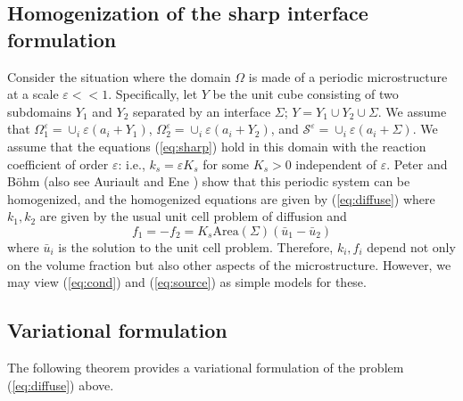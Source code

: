 \documentclass[11pt]{article}
\begin{document}
\subsection{Homogenization of the sharp interface formulation}

Consider the situation where the domain $\Omega$ is made of a periodic microstructure at a scale $\varepsilon << 1$.  Specifically, let $Y$ be the unit cube consisting of two subdomains $Y_1$ and $Y_2$ separated by an interface $\Sigma$; $Y = Y_1 \cup Y_2\cup\Sigma$.  We assume that $\Omega^\varepsilon_1 = \cup_i \varepsilon (a_i + Y_1)$, $\Omega^\varepsilon_2 = \cup_i \varepsilon (a_i + Y_2)$, and ${\mathcal S}^\varepsilon = \cup_i \varepsilon (a_i + \Sigma)$.  We assume that the equations (\ref{eq:sharp}) hold in this domain with the reaction coefficient of order $\varepsilon$: i.e., $k_s = \varepsilon K_s$ for some $K_s>0$ independent of $\varepsilon$. Peter and B\"ohm \cite{peter2008different} (also see Auriault and Ene \cite{auriault}) show that this periodic system can be homogenized, and the homogenized equations are given by (\ref{eq:diffuse}) where $k_1, k_2$ are given by the usual unit cell problem of diffusion and 
$$
f_1 = - f_2 = K_s \mbox{Area} (\Sigma) (\bar{u}_1 - \bar{u}_2)
$$
where $\bar{u}_i$ is the solution to the unit cell problem.  Therefore, $k_i, f_i$ depend not only on the volume fraction but also other aspects of the microstructure.  However, we may view (\ref{eq:cond}) and (\ref{eq:source}) as simple models for these.


\subsection{Variational formulation}


The following theorem provides a variational formulation of the problem (\ref{eq:diffuse}) above.
\end{document}
